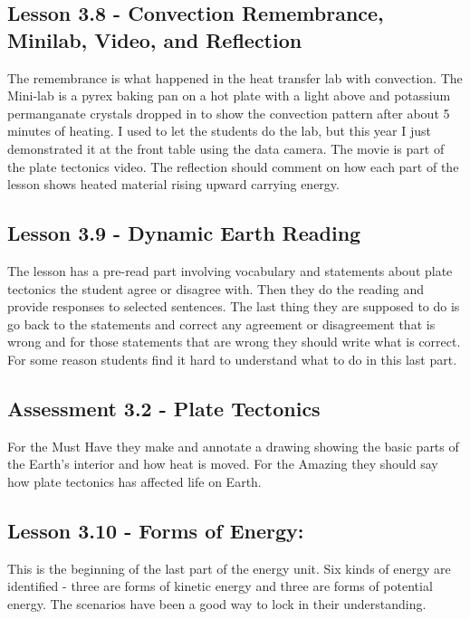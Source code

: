 \documentclass[12pt]{article}
\begin{document}
\subsection{Lesson 3.8 - Convection Remembrance, Minilab, Video, and Reflection}

The remembrance is what happened in the heat transfer lab with convection. The Mini-lab is a pyrex baking pan on a hot plate with a light above and potassium permanganate crystals
dropped in to show the convection pattern after about 5 minutes of heating. I used to let the students do the lab, but this year I just demonstrated it at the front table using the
data camera. The movie is part of the plate tectonics video. The reflection should comment on how each part of the lesson shows heated material rising upward carrying
energy.

\subsection{Lesson 3.9 - Dynamic Earth Reading} 

The lesson has a pre-read part involving vocabulary and statements about plate tectonics the student agree or disagree with. Then they do the reading and provide responses to selected sentences. The last thing they are supposed to do is go back to the statements and correct any agreement or disagreement that is wrong and for those statements that are wrong they should write
what is correct. For some reason students find it hard to understand what to do in this last part.

\subsection*{Assessment 3.2 - Plate Tectonics} 

For the Must Have they make and annotate a drawing showing the basic parts of the Earth's interior and how heat is moved. For the Amazing they should say how plate tectonics has affected life on Earth.

\subsection{Lesson 3.10 - Forms of Energy:} 

This is the beginning of the last part of the energy unit.
Six kinds of energy are identified - three are forms of kinetic energy and three are forms of potential energy. The scenarios have been a good way to lock in their understanding.
\end{document}

